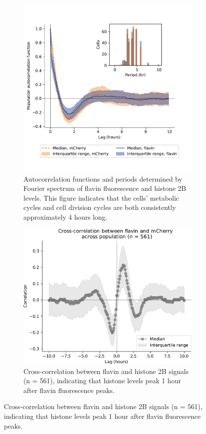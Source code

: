 \begin{figure}
\begin{subfigure}[htpb]{0.9\textwidth}
  \end{subfigure}
  \begin{subfigure}[t]{0.4\textwidth}
   \centering
   \includegraphics[width=\textwidth]{htb2mCherry_31594_12.pdf}
   \caption{
     Autocorrelation functions and periods determined by Fourier spectrum of flavin fluorescence and histone 2B levels.
     This figure indicates that the cells' metabolic cycles and cell division cycles are both consistently approximately 4 hours long.
   }
   \label{fig:biology-pyruvate-acf}
  \end{subfigure}%
  \begin{subfigure}[t]{0.4\textwidth}
   \centering
   \includegraphics[width=\textwidth]{pyruvate_xcf_edit.pdf}
   \caption{
    Cross-correlation between flavin and histone 2B signals (n = 561), indicating that histone levels peak 1 hour after flavin fluorescence peaks.
   }
   \label{fig:biology-pyruvate-xcf}
  \end{subfigure}


\end{figure}
